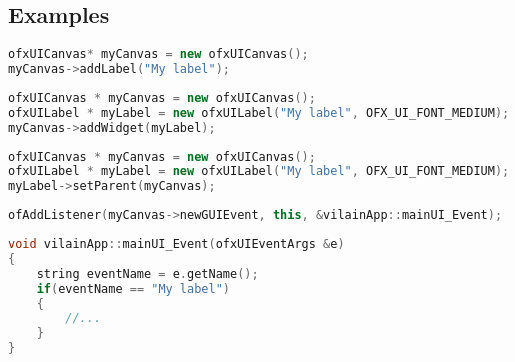 \documentclass[a4paper,titlepage,oneside]{article}
\begin{document}
\subsection*{Examples}
\begin{lstlisting}[language=C++, caption={\texttt{ofxUIWidget} first way implementation}, label={lst:widgetExample_1}]
ofxUICanvas* myCanvas = new ofxUICanvas();
myCanvas->addLabel("My label");
\end{lstlisting}
			
\begin{lstlisting}[language=C++, caption={\texttt{ofxUIWidget} second way implementation}, label={lst:widgetExample_2}]
ofxUICanvas * myCanvas = new ofxUICanvas();
ofxUILabel * myLabel = new ofxUILabel("My label", OFX_UI_FONT_MEDIUM);
myCanvas->addWidget(myLabel);
\end{lstlisting}
		
\begin{lstlisting}[language=C++, caption={\texttt{ofxUIWidget} third way implementation}, label={lst:widgetExample_3}]
ofxUICanvas * myCanvas = new ofxUICanvas();
ofxUILabel * myLabel = new ofxUILabel("My label", OFX_UI_FONT_MEDIUM);
myLabel->setParent(myCanvas);
\end{lstlisting}
		
\begin{lstlisting}[language=C++, caption={\texttt{ofxUI} event listener}, label={lst:eventListener}]
ofAddListener(myCanvas->newGUIEvent, this, &vilainApp::mainUI_Event);
\end{lstlisting}
		
\begin{lstlisting}[language=C++, caption={\texttt{ofxUI} event listener}, label={lst:eventManagement}]
void vilainApp::mainUI_Event(ofxUIEventArgs &e)
{
    string eventName = e.getName();
    if(eventName == "My label")
    {
        //...
    }
}
\end{lstlisting}


\printbibheading
\printbibliography[nottype=online,check=notonline,heading=subbibliography,title={Bibliography}]
\printbibliography[check=online,heading=subbibliography,title={Webography}]
\nocite{openframeworks,ofxUI,REZAALI,OF_TUTORIALS_ofauckland,ofBook}
\end{document}
